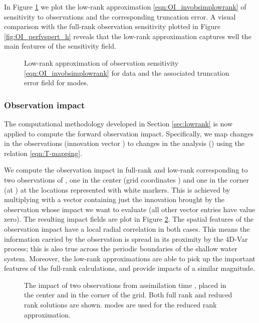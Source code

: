 \documentclass[final,sort&compress]{elsarticle}
\begin{document}
In Figure \ref{fig:OI_redrank} we plot the low-rank approximation \eqref{eqn:OI_invobsimplowrank} of sensitivity to  observations and the corresponding truncation error.
A visual comparison with the full-rank observation sensitivity plotted in Figure \ref{fig:OI_perfvspert_h} reveals that 
the low-rank approximation captures well the main features of the sensitivity field.

 \begin{figure}
 \setcounter{subfigure}{0}
  \centering
  \caption{Low-rank approximation of observation sensitivity \eqref{eqn:OI_invobsimplowrank} for  data and the associated truncation error field for  modes.}
  \label{fig:OI_redrank}
 \end{figure}

\subsubsection{Observation impact}

The computational methodology developed in Section \ref{sec:lowrank} is now applied
to compute the forward observation impact. Specifically, we map changes
in the observations (innovation vector ) to changes
in the analysis () using the relation \eqref{eqn:T-mapping}.

We compute the observation impact in full-rank and low-rank corresponding to two observations of ,
one in the center (grid coordinates ) and one in the corner (at ) at the locations represented with white markers.
This is achieved  by multiplying  with a vector containing just the innovation brought 
by the observation whose impact we want to evaluate (all other vector entries have value zero).
The resulting impact fields are plot in Figure \ref{fig:OI_forwardobsimp}.
The spatial features of the observation impact have a local radial correlation in both cases.
This means the information carried by the observation is spread in its proximity by the 4D-Var process;
this is also true across the periodic boundaries of the shallow water system.
Moreover, the low-rank approximations are able to pick up the important features of the full-rank calculations,
and provide impacts of a similar magnitude.
\begin{figure}
 \setcounter{subfigure}{0}
  \centering
  \caption{The impact of two  observations from assimilation time , placed in the center and in the corner of the grid.
  Both full rank and reduced rank solutions are shown.  modes are used for the reduced rank approximation.}
  \label{fig:OI_forwardobsimp}
 \end{figure}
\end{document}
